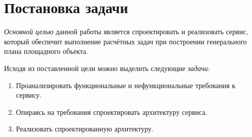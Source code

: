 \section*{\Large{Постановка задачи}}

\textit{Основной целью} данной работы является спроектировать и реализовать сервис, который обеспечит
выполнение расчётных задач при построении генерального плана площадного объекта.

Исходя из поставленной цели можно выделить следующие \textit{задачи}:
\begin{enumerate}
    \item Проанализировать функциональные и нефункциональные требования к сервису.
    \item Опираясь на требования спроектировать архитектуру сервиса.
    \item Реализовать спроектированную архитектуру.
\end{enumerate}
